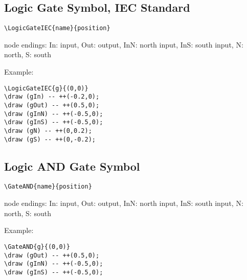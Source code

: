 \documentclass[parskip=full]{scrartcl}
\begin{document}
\subsection{Logic Gate Symbol, IEC Standard}

\begin{verbatim}
\LogicGateIEC{name}{position}
\end{verbatim}
node endings: In: input, Out: output,
              InN: north input, InS: south input,
              N: north, S: south

Example:\\
\begin{minipage}{0.8\textwidth}
\begin{verbatim}
\LogicGateIEC{g}{(0,0)}
\draw (gIn) -- ++(-0.2,0);
\draw (gOut) -- ++(0.5,0);
\draw (gInN) -- ++(-0.5,0);
\draw (gInS) -- ++(-0.5,0);
\draw (gN) -- ++(0,0.2);
\draw (gS) -- ++(0,-0.2);
\end{verbatim}
\end{minipage}
\begin{minipage}{0.19\textwidth}
\end{minipage}

\subsection{Logic AND Gate Symbol}

\begin{verbatim}
\GateAND{name}{position}
\end{verbatim}
node endings: In: input, Out: output,
              InN: north input, InS: south input,
              N: north, S: south

Example:\\
\begin{minipage}{0.8\textwidth}
\begin{verbatim}
\GateAND{g}{(0,0)}
\draw (gOut) -- ++(0.5,0);
\draw (gInN) -- ++(-0.5,0);
\draw (gInS) -- ++(-0.5,0);
\end{verbatim}
\end{minipage}
\begin{minipage}{0.19\textwidth}
\end{minipage}
\end{document}
